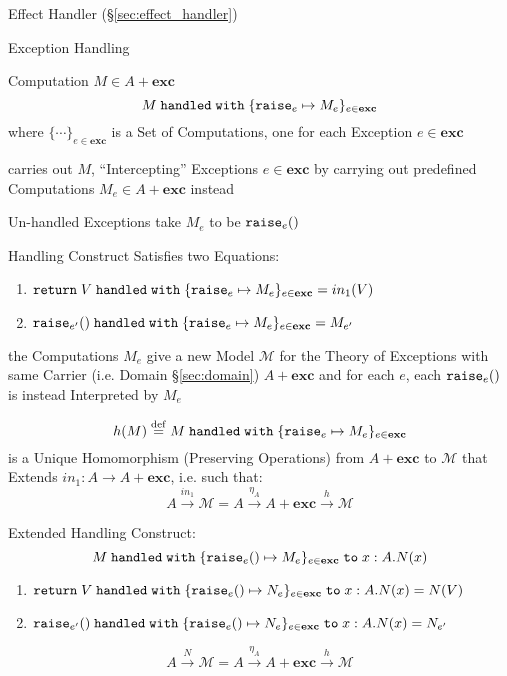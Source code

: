 Effect Handler (\S\ref{sec:effect_handler})

Exception Handling

Computation $M \in A + \mathbf{exc}$
\[
  M \;\mathtt{handled\;with}\;
    \{\mathtt{raise}_e \mapsto M_e \}_{e\in\mathbf{exc}}
\]
where $\{\cdots\}_{e\in\mathbf{exc}}$ is a Set of Computations, one
for each Exception $e \in \mathbf{exc}$

carries out $M$, ``Intercepting'' Exceptions $e \in \mathbf{exc}$ by
carrying out predefined Computations $M_e \in A + \mathbf{exc}$
instead

Un-handled Exceptions take $M_e$ to be $\mathtt{raise}_e()$

Handling Construct Satisfies two Equations:
\begin{enumerate}
  \item $\mathtt{return}\; V \;\mathtt{handled\;with}\;
    \{\mathtt{raise}_e \mapsto M_e\}_{e \in \mathbf{exc}}
    = in_1(V)$
  \item $\mathtt{raise}_{e'}() \;\mathtt{handled\;with}\;
    \{\mathtt{raise}_e \mapsto M_e\}_{e \in \mathbf{exc}}
    = M_{e'}$
\end{enumerate}

the Computations $M_e$ give a new Model $\mathcal{M}$ for the Theory
of Exceptions with same Carrier (i.e. Domain \S\ref{sec:domain}) $A +
\mathbf{exc}$ and for each $e$, each $\mathtt{raise}_e ()$ is instead
Interpreted by $M_e$

\[
  h(M) \stackrel{\mathrm{def}}= M \;\mathtt{handled\;with}\;
    \{\mathtt{raise}_e \mapsto M_e\}_{e \in \mathbf{exc}}
\]
is a Unique Homomorphism (Preserving Operations) from $A +
\mathbf{exc}$ to $\mathcal{M}$ that Extends $in_1 : A \rightarrow A +
\mathbf{exc}$, i.e. such that:
\[
  A \xrightarrow{in_1} \mathcal{M} =
    A \xrightarrow{\eta_A} A + \mathbf{exc} \xrightarrow{h} \mathcal{M}
\]

Extended Handling Construct:
\[
  M \;\mathtt{handled\;with}\;
    \{\mathtt{raise}_e() \mapsto M_e \}_{e\in\mathbf{exc}}
    \;\mathtt{to}\; x : A.N(x)
\]

\begin{enumerate}
  \item $\mathtt{return}\; V \;\mathtt{handled\;with}\;
    \{\mathtt{raise}_e() \mapsto N_e\}_{e \in \mathbf{exc}}
    \;\mathtt{to}\; x:A.N(x)
    = N(V)$
  \item $\mathtt{raise}_{e'}() \;\mathtt{handled\;with}\;
    \{\mathtt{raise}_e() \mapsto N_e\}_{e \in \mathbf{exc}}
    \;\mathtt{to}\; x:A.N(x)
    = N_{e'}$
\end{enumerate}
\[
  A \xrightarrow{N} \mathcal{M} =
    A \xrightarrow{\eta_A} A + \mathbf{exc} \xrightarrow{h} \mathcal{M}
\]

